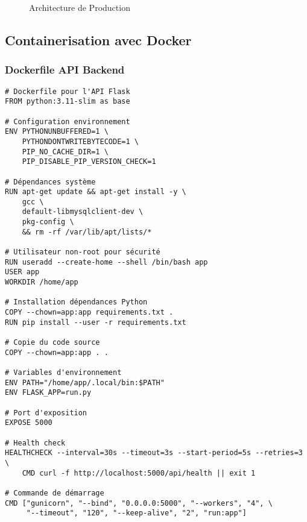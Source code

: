 \begin{figure}[H]
\caption{Architecture de Production}
\end{figure}

\subsection{Containerisation avec Docker}

\subsubsection{Dockerfile API Backend}

\begin{lstlisting}[language=docker]
# Dockerfile pour l'API Flask
FROM python:3.11-slim as base

# Configuration environnement
ENV PYTHONUNBUFFERED=1 \
    PYTHONDONTWRITEBYTECODE=1 \
    PIP_NO_CACHE_DIR=1 \
    PIP_DISABLE_PIP_VERSION_CHECK=1

# Dépendances système
RUN apt-get update && apt-get install -y \
    gcc \
    default-libmysqlclient-dev \
    pkg-config \
    && rm -rf /var/lib/apt/lists/*

# Utilisateur non-root pour sécurité
RUN useradd --create-home --shell /bin/bash app
USER app
WORKDIR /home/app

# Installation dépendances Python
COPY --chown=app:app requirements.txt .
RUN pip install --user -r requirements.txt

# Copie du code source
COPY --chown=app:app . .

# Variables d'environnement
ENV PATH="/home/app/.local/bin:$PATH"
ENV FLASK_APP=run.py

# Port d'exposition
EXPOSE 5000

# Health check
HEALTHCHECK --interval=30s --timeout=3s --start-period=5s --retries=3 \
    CMD curl -f http://localhost:5000/api/health || exit 1

# Commande de démarrage
CMD ["gunicorn", "--bind", "0.0.0.0:5000", "--workers", "4", \
     "--timeout", "120", "--keep-alive", "2", "run:app"]
\end{lstlisting}

